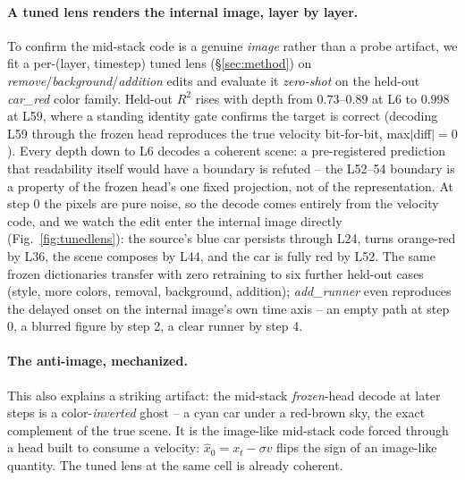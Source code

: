 \paragraph{A tuned lens renders the internal image, layer by layer.} To
confirm the mid-stack code is a genuine \emph{image} rather than a probe
artifact, we fit a per-(layer, timestep) tuned lens
(\S\ref{sec:method}) on \emph{remove}/\emph{background}/\emph{addition}
edits and evaluate it \emph{zero-shot} on the held-out \emph{car\_red}
color family. Held-out $R^2$ rises with depth from $0.73$--$0.89$ at L6 to
$0.998$ at L59, where a standing identity gate confirms the target is
correct (decoding L59 through the frozen head reproduces the true velocity
bit-for-bit, max$|$diff$|{=}0$). Every depth down to L6 decodes a coherent
scene: a pre-registered prediction that readability itself would have a
boundary is refuted -- the L52--54 boundary is a property of the frozen
head's one fixed projection, not of the representation. At step 0 the
pixels are pure noise, so the decode comes entirely from the velocity
code, and we watch the edit enter the internal image directly
(Fig.~\ref{fig:tunedlens}): the source's blue car persists through L24,
turns orange-red by L36, the scene composes by L44, and the car is fully
red by L52. The same frozen dictionaries transfer with zero retraining to
six further held-out cases (style, more colors, removal, background,
addition); \emph{add\_runner} even reproduces the delayed onset on the
internal image's own time axis -- an empty path at step 0, a blurred
figure by step 2, a clear runner by step 4.

\paragraph{The anti-image, mechanized.} This also explains a striking
artifact: the mid-stack \emph{frozen}-head decode at later steps is a
color-\emph{inverted} ghost -- a cyan car under a red-brown sky, the exact
complement of the true scene. It is the image-like mid-stack code forced
through a head built to consume a velocity: $\hat x_0 = x_t - \sigma v$
flips the sign of an image-like quantity. The tuned lens at the same cell
is already coherent.
